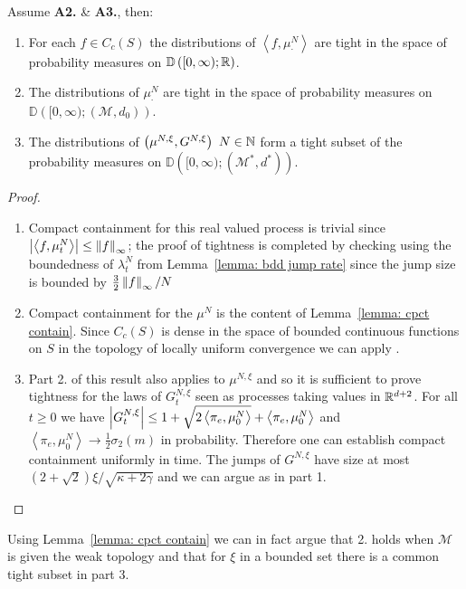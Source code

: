 \begin{lemma}\label{lemma: tight processes}
Assume \textbf{A2.} \& \textbf{A3.}, then:
\begin{enumerate} 
    \item For each $f \in C_c(S)$ the distributions of $\left<f, \mu_\cdot^N \right>$ are tight in the space of probability measures on $\mathbb{D}\left([0,\infty); \mathbb{R}\right)$.
    \item The distributions of $\mu_\cdot^N$ are tight in the space of probability measures on $\mathbb{D}\left([0,\infty);  \left(\mathcal{M}, d_0\right)\right)$.
    \item The distributions of $\left({\mu}^{N,\xi}, G^{N,\xi}\right)\ N\in\NN$ form a tight subset of the probability measures on $\mathbb{D}\left([0,\infty);  \left(\mathcal{M}^\ast, d^\ast\right)\right)$.
\end{enumerate}
\end{lemma}
\begin{proof}
\begin{enumerate}
    \item Compact containment for this real valued process is trivial since $\left\lvert{\left<f,\mu_t^N\right>}\right\rvert \leq \left\lVert{f}\right\rVert_\infty$; the proof of tightness is completed by checking \cite[Ch. 3, Thrm. 8.6 part c)]{EK86} using the boundedness of $\lambda_t^N$ from Lemma~\ref{lemma: bdd jump rate} since the jump size is bounded by $\frac32 \left\lVert{f}\right\rVert_\infty / N$
    \item Compact containment for the $\mu^N$ is the content of Lemma~\ref{lemma: cpct contain}.  Since $C_c(S)$ is dense in the space of bounded continuous functions on $S$ in the topology of locally uniform convergence we can apply \cite[Ch. 3, Lem. 9.1]{EK86}.
    \item Part 2. of this result also applies to $\mu^{N,\xi}$ and so it is sufficient to prove tightness for the laws of $G_t^{N,\xi}$ seen as processes taking values in $\mathbb{R}^{d+2}$.
    For all $t\geq 0$ we have $\left\lvert{G_t^{N,\xi}}\right\rvert \leq 1 + \sqrt{2\left<\pi_e, \mu_0^N\right>} + \left<\pi_e, \mu_0^N\right>$ and $\left<\pi_e, \mu_0^N \right> \rightarrow \frac12 \sigma_2(m)$ in probability.
    Therefore one can establish compact containment uniformly in time.
    The jumps of $G^{N,\xi}$ have size at most $(2+\sqrt{2})\xi/\sqrt{\kappa + 2 \gamma}$ and we can argue as in part 1.

\end{enumerate}
\end{proof}
\begin{remark}
Using Lemma~\ref{lemma: cpct contain} we can in fact argue that 2. holds when $\mathcal{M}$ is given the weak topology and that for $\xi$ in a bounded set there is a common tight subset in part 3.
\end{remark}

